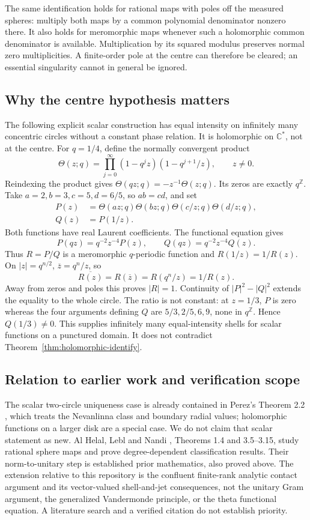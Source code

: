 The same identification holds for rational maps with poles off the measured
spheres: multiply both maps by a common polynomial denominator nonzero there.
It also holds for meromorphic maps whenever such a holomorphic common
denominator is available. Multiplication by its squared modulus preserves
normal zero multiplicities. A finite-order pole at the centre can therefore
be cleared; an essential singularity cannot in general be ignored.

\subsection{Why the centre hypothesis matters}
The following explicit scalar construction has equal intensity on infinitely
many concentric circles without a constant phase relation. It is holomorphic
on $\mathbb C^*$, not at the centre.
For $q=1/4$, define the normally convergent product
\[
 \Theta(z;q)=\prod_{j=0}^{\infty}(1-q^jz)(1-q^{j+1}/z),\qquad z\ne0.
\]
Reindexing the product gives
$\Theta(qz;q)=-z^{-1}\Theta(z;q)$. Its zeros are exactly $q^{\mathbb Z}$.
Take $a=2,b=3,c=5,d=6/5$, so $ab=cd$, and set
\[
 \begin{split}
 P(z)&=\Theta(az;q)\Theta(bz;q)\Theta(c/z;q)\Theta(d/z;q),\\
 Q(z)&=P(1/z).
 \end{split}
\]
Both functions have real Laurent coefficients. The functional equation gives
\[
 P(qz)=q^{-2}z^{-4}P(z),\qquad
 Q(qz)=q^{-2}z^{-4}Q(z).
\]
Thus $R=P/Q$ is a meromorphic $q$-periodic function and
$R(1/z)=1/R(z)$. On $|z|=q^{n/2}$, $\overline z=q^n/z$, so
\[
 \overline{R(z)}=R(\overline z)=R(q^n/z)=1/R(z).
\]
Away from zeros and poles this proves $|R|=1$. Continuity of $|P|^2-|Q|^2$
extends the equality to the whole circle. The ratio is not constant: at
$z=1/3$, $P$ is zero whereas the four arguments defining $Q$ are
$5/3,2/5,6,9$, none in $q^{\mathbb Z}$. Hence $Q(1/3)\ne0$.
This supplies infinitely many equal-intensity shells for scalar functions on
a punctured domain. It does not contradict Theorem~\ref{thm:holomorphic-identify}.

\subsection{Relation to earlier work and verification scope}
The scalar two-circle uniqueness case is already contained in Perez's
Theorem 2.2 \cite{Perez2021}, which treats the Nevanlinna class and boundary
radial values; holomorphic functions on a larger disk are a special case.
We do not claim that scalar statement as new. Al Helal, Lebl and Nandi
\cite{ALN2024}, Theorems 1.4 and 3.5--3.15, study rational sphere maps and
prove degree-dependent classification results. Their norm-to-unitary step is
established prior mathematics, also proved above. The extension relative to
this repository is the confluent finite-rank analytic contact argument and
its vector-valued shell-and-jet consequences, not the unitary Gram argument,
the generalized Vandermonde principle, or the theta functional equation.
A literature search and a verified citation do not establish priority.

